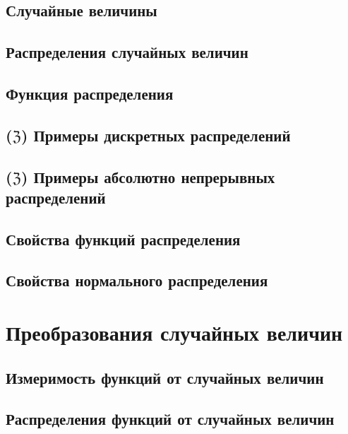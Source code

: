 \subsection{Случайные величины}


\subsection{Распределения случайных величин}


\subsection{Функция распределения}


\subsection{\texorpdfstring{($\mathfrak Z$)}{} Примеры дискретных распределений}


\subsection{\texorpdfstring{($\mathfrak Z$)}{} Примеры абсолютно непрерывных распределений}


\subsection{Свойства функций распределения}


\subsection{Свойства нормального распределения}






\section{Преобразования случайных величин}

\subsection{Измеримость функций от случайных величин}


\subsection{Распределения функций от случайных величин}






